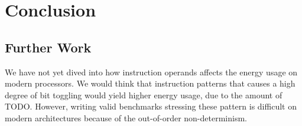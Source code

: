 \section{Conclusion}

\subsection{Further Work}

We have not yet dived into how instruction operands affects the energy usage on
modern processors. We would think that instruction patterns that causes a high
degree of bit toggling would yield higher energy usage, due to the amount of
TODO. However, writing valid benchmarks stressing these pattern is difficult on
modern architectures because of the out-of-order non-determinism.
